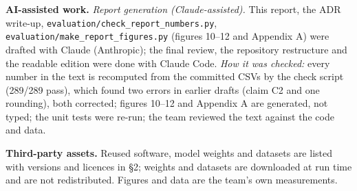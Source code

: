 \documentclass[10pt,a4paper]{article}
\newcommand{\fp}[1]{{\leavevmode\urlstyle{tt}\color{codecol}\nolinkurl{#1}}}
\begin{document}
\textbf{AI-assisted work.} \emph{Report generation (Claude-assisted).} This report, the ADR write-up,
\fp{evaluation/check_report_numbers.py}, \fp{evaluation/make_report_figures.py} (figures 10--12 and Appendix A) were
drafted with Claude (Anthropic); the final review, the repository restructure and the readable edition were done with
Claude Code. \emph{How it was checked:} every number in the text is recomputed from the committed CSVs by the check
script (289/289 pass), which found two errors in earlier drafts (claim C2 and one rounding), both corrected; figures
10--12 and Appendix A are generated, not typed; the unit tests were re-run; the team reviewed the text against the
code and data.

\textbf{Third-party assets.} Reused software, model weights and datasets are listed with versions and licences in
\S2; weights and datasets are downloaded at run time and are not redistributed. Figures and data are the team's own
measurements.
\end{document}
